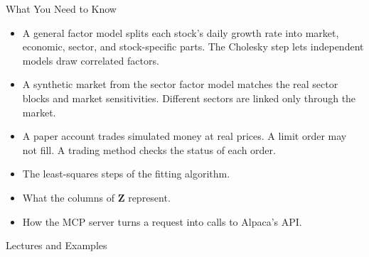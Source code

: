 \documentclass[aspectratio=169,11pt]{beamer}
\newcommand{\repo}{https://github.com/varnerlab/CHEME-5660-CourseRepository-Fall-2026/blob/main/lectures/week-14/L14a}
\begin{document}
\begin{frame}{What You Need to Know}
  \vspace{0.05em}
  {\large\textbf{}}
  \begin{itemize}\setlength{\itemsep}{0.2em}
    \item A general factor model splits each stock's daily growth rate into market, economic,
      sector, and stock-specific parts. The Cholesky step lets independent models draw
      correlated factors.
    \item A synthetic market from the sector factor model matches the real sector blocks and market
      sensitivities. Different sectors are linked only through the market.
    \item A paper account trades simulated money at real prices. A limit order may not fill. A
      trading method checks the status of each order.
  \end{itemize}

  \vspace{0.2em}
  {\large\textbf{} }
  \begin{itemize}\setlength{\itemsep}{0.2em}
    \item The least-squares steps of the fitting algorithm.
    \item What the columns of $\mathbf{Z}$ represent.
    \item How the MCP server turns a request into calls to Alpaca's API.
  \end{itemize}
\end{frame}

\begin{frame}{Lectures and Examples}
  \vspace{0.3em}
  {\normalsize\textbf{}\par\small
  \href{\repo/CHEME-5660-L14a-Lecture-UpdatingSIM-PaperTrading-Fall-2026.ipynb}{}}

  \vspace{0.6em}
  {\normalsize\textbf{}\par\small
  \href{\repo/CHEME-5660-L14a-Example-JumpHMM-SectorFactor-Fall-2026.ipynb}{}\par
  \href{\repo/alpaca-mcp/README.md}{}}
\end{frame}
\end{document}
